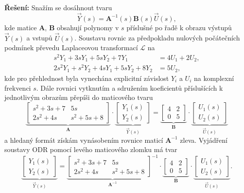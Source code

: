 \documentclass[twoside]{article}
\begin{document}
\textbf{Řešení:}
Snažím se dosáhnout tvaru 
\begin{equation}
	\vec{Y}(s) = \mathbf{A}^{-1}(s)\mathbf{B}(s) \vec{U}(s),
\end{equation}
kde matice $\mathbf{A}$, $\mathbf{B}$ obsahují polynomy v $s$ příslušné po řadě k obrazu
výstupů $\vec{Y}(s)$ a vstupů $\vec{U}(s)$. Soustavu rovnic za předpokladu nulových počátečních
podmínek převedu Laplaceovou transformací $\mathcal{L}$ na 
\begin{equation}
	\begin{split}
		s^2 Y_1 + 3sY_1 + 5 s Y_2 + 7 Y_1 &= 4 U_1 + 2 U_2, \\
		2s^2 Y_1 + s^2 Y_2 + 4 s Y_1 + 5 s Y_2 + 8 Y_2 &= 5 U_2,
	\end{split}
\end{equation}
kde pro přehlednost byla vynechána explicitní závislost $Y_i$ a $U_i$ na komplexní frekvenci $s$.
Dále rovnici vytknutím a sdružením koeficientů příslušících k jednotlivým obrazům přepíši do maticového tvaru 
\begin{equation}
	\underbrace{\begin{bmatrix}
		s^2 + 3s + 7 & 5s \\
		2s^2 + 4s & s^2 + 5s + 8
	\end{bmatrix}}_{\mathbf{A}} \cdot \underbrace{\begin{bmatrix}
		Y_1(s) \\ Y_2(s)
	\end{bmatrix}}_{\vec{Y}(s)} = \underbrace{\begin{bmatrix}
		4 & 2 \\
		0 & 5
	\end{bmatrix}}_{\mathbf{B}} \cdot \underbrace{\begin{bmatrix}
		U_1(s) \\ U_2(s)
	\end{bmatrix}}_{\vec{U}(s)}
\end{equation}
a hledaný formát získám vynásobením rovnice maticí $\mathbf{A}^{-1}$ zleva.
Vyjádření soustavy ODR pomocí levého maticového zlomku má tvar
\begin{equation}
	\underbrace{\begin{bmatrix}
		Y_1(s) \\ Y_2(s)
	\end{bmatrix}}_{\vec{Y}(s)} = \underbrace{\begin{bmatrix}
		s^2 + 3s + 7 & 5s \\
		2s^2 + 4s & s^2 + 5s + 8
	\end{bmatrix}^{-1}}_{\mathbf{A}^{-1}} \cdot \underbrace{\begin{bmatrix}
		4 & 2 \\
		0 & 5
	\end{bmatrix}}_{\mathbf{B}} \cdot \underbrace{\begin{bmatrix}
		U_1(s) \\ U_2(s)
	\end{bmatrix}}_{\vec{U}(s)}.
\end{equation}
\end{document}
